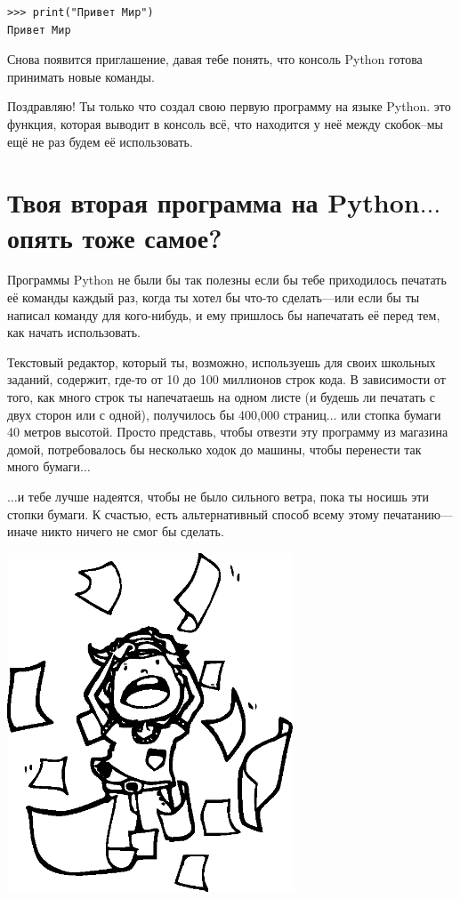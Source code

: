 \begin{listing}
\begin{verbatim}
>>> print("Привет Мир")
Привет Мир
\end{verbatim}
\end{listing}

Снова появится приглашение, давая тебе понять, что консоль Python готова принимать новые команды.

\noindent
Поздравляю! Ты только что создал свою первую программу на языке Python.   это функция, которая выводит в консоль всё, что находится у неё между скобок--мы ещё не раз будем её использовать.

\section{Твоя вторая программа на Python$\ldots$опять тоже самое?}

Программы Python не были бы так полезны если бы тебе приходилось печатать её команды каждый раз, когда ты хотел бы что-то сделать---или если бы ты написал команду для кого-нибудь, и ему пришлось бы напечатать её перед тем, как начать использовать.

Текстовый редактор, который ты, возможно, используешь для своих школьных заданий, содержит, где-то от 10 до 100 миллионов строк кода. В зависимости от того, как много строк ты напечатаешь на одном листе (и будешь ли печатать с двух сторон или с одной), получилось бы 400,000 страниц$\ldots$ или стопка бумаги 40 метров высотой.
Просто представь, чтобы отвезти эту программу из магазина домой, потребовалось бы несколько ходок до машины, чтобы перенести так много бумаги$\ldots$

$\ldots$и тебе лучше надеятся, чтобы не было сильного ветра, пока ты носишь эти стопки бумаги. К счастью, есть альтернативный способ всему этому печатанию---иначе никто ничего не смог бы сделать.

\begin{center}
\includegraphics*[width=85mm]{pullinghair.eps}
\end{center}

